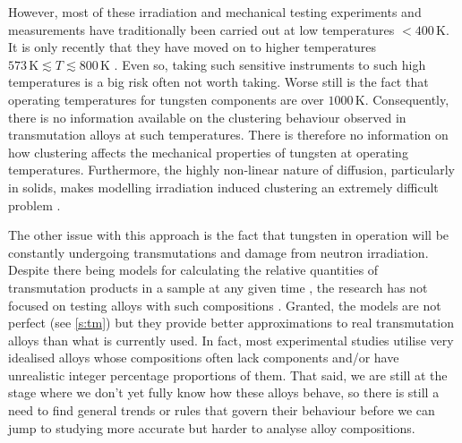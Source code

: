 \documentclass[12pt, a4paper]{article}
\begin{document}
		However, most of these irradiation and mechanical testing experiments and measurements have traditionally been carried out at low temperatures $< 400\,\textrm{K}$. It is only recently that they have moved on to higher temperatures $573\,\textrm{K} \lesssim T \lesssim 800\,\textrm{K}$ \cite{ionirrmic, ionirrprop, ionirrprop2, hardening}. Even so, taking such sensitive instruments to such high temperatures is a big risk often not worth taking. Worse still is the fact that operating temperatures for tungsten components are over $1000\,\textrm{K}$. Consequently, there is no information available on the clustering behaviour observed in transmutation alloys at such temperatures. There is therefore no information on how clustering affects the mechanical properties of tungsten at operating temperatures. Furthermore, the highly non-linear nature of diffusion, particularly in solids, makes modelling irradiation induced clustering an extremely difficult problem \cite{difsol1, difsol2,modelcluster}.
		
		The other issue with this approach is the fact that tungsten in operation will be constantly undergoing transmutations and damage from neutron irradiation. Despite there being models for calculating the relative quantities of transmutation products in a sample at any given time \cite{transmute2}, the research has not focused on testing alloys with such compositions \cite{ionirrmic, ionirrprop, ionirrprop2, hardening}. Granted, the models are not perfect (see \cref{s:tm}) but they provide better approximations to real transmutation alloys than what is currently used. In fact, most experimental studies utilise very idealised alloys whose compositions often lack components and/or have unrealistic integer percentage proportions of them. That said, we are still at the stage where we don't yet fully know how these alloys behave, so there is still a need to find general trends or rules that govern their behaviour before we can jump to studying more accurate but harder to analyse alloy compositions.
\end{document}
